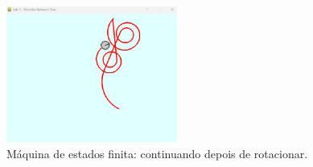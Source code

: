 \documentclass[brazil, 12pt]{article}
\begin{document}
\begin{figure}[H]
	\centering
	\includegraphics[width=0.5\textwidth]{BT_continue} %
	\caption{Máquina de estados finita: continuando depois de rotacionar.} %
	\label{fig:BT_continue}  %
\end{figure}
\end{document}
